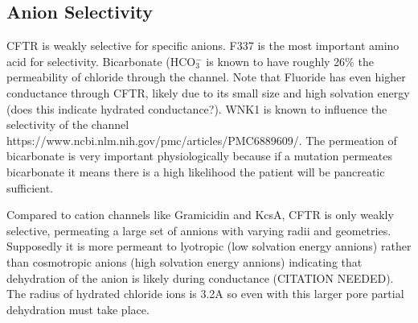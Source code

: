 \subsection {Anion Selectivity}
CFTR is weakly selective for specific anions. F337 is the most important amino acid for selectivity. Bicarbonate (HCO$_3^-$ is known to have roughly 26\% the permeability of chloride through the channel. Note that Fluoride has even higher conductance through CFTR, likely due to its small size and high solvation energy (does this indicate hydrated conductance?). WNK1 is known to influence the selectivity of the channel https://www.ncbi.nlm.nih.gov/pmc/articles/PMC6889609/. The permeation of bicarbonate is very important physiologically because if a mutation permeates bicarbonate it means there is a high likelihood the patient will be pancreatic sufficient. 

Compared to cation channels like Gramicidin and KcsA, CFTR is only weakly selective, permeating a large set of annions with varying radii and geometries. Supposedly it is more permeant to lyotropic (low solvation energy annions) rather than cosmotropic anions (high solvation energy annions) indicating that dehydration of the anion is likely during conductance (CITATION NEEDED). The radius of hydrated chloride ions is 3.2A\cite{yang2002} so even with this larger pore partial dehydration must take place. 

